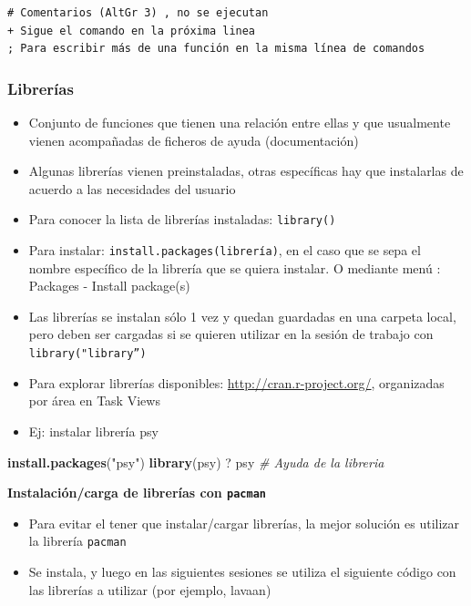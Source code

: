 \documentclass[]{article}
\newenvironment{Shaded}{\begin{snugshade}}{\end{snugshade}}
\newcommand{\CommentTok}[1]{\textcolor[rgb]{0.56,0.35,0.01}{\textit{#1}}}
\newcommand{\KeywordTok}[1]{\textcolor[rgb]{0.13,0.29,0.53}{\textbf{#1}}}
\newcommand{\NormalTok}[1]{#1}
\newcommand{\StringTok}[1]{\textcolor[rgb]{0.31,0.60,0.02}{#1}}
\providecommand{\tightlist}{%
  \setlength{\itemsep}{0pt}\setlength{\parskip}{0pt}}
\begin{document}
\begin{verbatim}
# Comentarios (AltGr 3) , no se ejecutan
+ Sigue el comando en la próxima linea
; Para escribir más de una función en la misma línea de comandos
\end{verbatim}

\hypertarget{librerias}{%
\subsubsection{Librerías}\label{librerias}}

\begin{itemize}
\tightlist
\item
  Conjunto de funciones que tienen una relación entre ellas y que
  usualmente vienen acompañadas de ficheros de ayuda (documentación)
\item
  Algunas librerías vienen preinstaladas, otras específicas hay que
  instalarlas de acuerdo a las necesidades del usuario
\item
  Para conocer la lista de librerías instaladas: \texttt{library()}
\item
  Para instalar: \texttt{install.packages(librería)}, en el caso que se
  sepa el nombre específico de la librería que se quiera instalar. O
  mediante menú : Packages - Install package(s)
\item
  Las librerías se instalan sólo 1 vez y quedan guardadas en una carpeta
  local, pero deben ser cargadas si se quieren utilizar en la sesión de
  trabajo con \texttt{library("library”)}
\item
  Para explorar librerías disponibles: \url{http://cran.r-project.org/},
  organizadas por área en Task Views
\item
  Ej: instalar librería psy
\end{itemize}

\begin{Shaded}
\begin{Highlighting}[]
\KeywordTok{install.packages}\NormalTok{(}\StringTok{"psy"}\NormalTok{)}
\KeywordTok{library}\NormalTok{(psy)}
\NormalTok{? psy }\CommentTok{# Ayuda de la libreria}
\end{Highlighting}
\end{Shaded}

\textbf{Instalación/carga de librerías con \texttt{pacman}}

\begin{itemize}
\item
  Para evitar el tener que instalar/cargar librerías, la mejor solución
  es utilizar la librería \texttt{pacman}
\item
  Se instala, y luego en las siguientes sesiones se utiliza el siguiente
  código con las librerías a utilizar (por ejemplo, lavaan)
\end{itemize}
\end{document}
